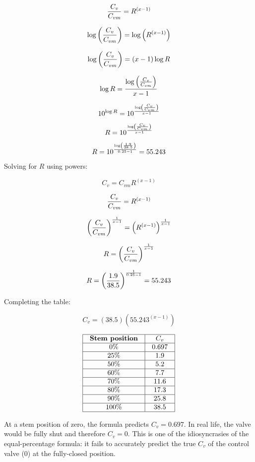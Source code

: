 $${C_v \over C_{vm}} = R^{(x - 1)}$$

$$\log \left({C_v \over C_{vm}}\right) = \log \left( R^{(x - 1)} \right)$$

$$\log \left({C_v \over C_{vm}}\right) = (x - 1) \log R $$

$$\log R = {\log \left({C_v \over C_{vm}}\right) \over x - 1}$$

$$10^{\log R} = 10^{{\log \left({C_v \over C_{vm}}\right) \over x - 1}}$$

$$R = 10^{{\log \left({C_v \over C_{vm}}\right) \over x - 1}}$$

$$R = 10^{{\log \left({1.9 \over 38.5}\right) \over 0.25 - 1}} = 55.243$$

\vskip 10pt

Solving for $R$ using powers:

$$C_v = C_{vm} R^{(x - 1)}$$

$${C_v \over C_{vm}} = R^{(x - 1)}$$

$$\left({C_v \over C_{vm}}\right)^{1 \over x - 1} = \left(R^{(x - 1)}\right)^{1 \over x - 1}$$

$$R = \left({C_v \over C_{vm}}\right)^{1 \over x - 1}$$

$$R = \left({1.9 \over 38.5}\right)^{1 \over 0.25 - 1} = 55.243$$

\vskip 10pt

\filbreak

Completing the table:

$$C_v = (38.5) \left(55.243^{(x - 1)}\right)$$


$$\vbox{\offinterlineskip
\halign{\strut
\vrule \quad\hfil # \ \hfil & 
\vrule \quad\hfil # \ \hfil \vrule \cr
\noalign{\hrule}
%
{\bf Stem position} & $C_v$ \cr
%
\noalign{\hrule}
%
0\% & 0.697 \cr
%
\noalign{\hrule}
%
25\% & 1.9 \cr
%
\noalign{\hrule}
%
50\% & 5.2 \cr
%
\noalign{\hrule}
%
60\% & 7.7 \cr
%
\noalign{\hrule}
%
70\% & 11.6 \cr
%
\noalign{\hrule}
%
80\% & 17.3 \cr
%
\noalign{\hrule}
%
90\% & 25.8 \cr
%
\noalign{\hrule}
%
100\% & 38.5 \cr
%
\noalign{\hrule}
} %
}$$ %

At a stem position of zero, the formula predicts $C_v = 0.697$.  In real life, the valve would be fully shut and therefore $C_v = 0$.  This is one of the idiosyncrasies of the equal-percentage formula: it fails to accurately predict the true $C_v$ of the control valve (0) at the fully-closed position.





